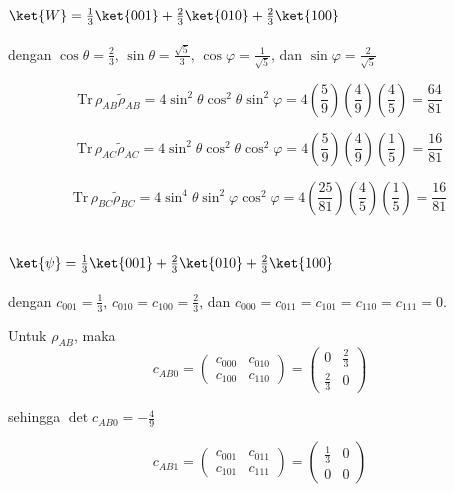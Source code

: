 \subsection{$\ket{W}=\frac{1}{3}\ket{001}+\frac{2}{3}\ket{010}+\frac{2}{3}\ket{100}$}
dengan $\cos\theta=\frac{2}{3}$, $\sin\theta={\frac{\sqrt{5}}{3}}$, $\cos\varphi=\frac{1}{\sqrt{5}}$, dan $\sin\varphi=\frac{2}{\sqrt{5}}$

\begin{equation}
	\mathrm{Tr}\,\rho_{AB}\tilde{\rho}_{AB}=4\sin^2\theta \cos^2\theta \sin^2\varphi=4(\frac{5}{9})(\frac{4}{9})(\frac{4}{5})=\frac{64}{81}
\end{equation}

\begin{equation}
	\mathrm{Tr}\,\rho_{AC}\tilde{\rho}_{AC}=4\sin^2\theta \cos^2\theta \cos^2\varphi=4(\frac{5}{9})(\frac{4}{9})(\frac{1}{5})=\frac{16}{81}
\end{equation}

\begin{equation}
	\mathrm{Tr}\,\rho_{BC}\tilde{\rho}_{BC}=4\sin^4\theta \sin^2\varphi\cos^2\varphi=4(\frac{25}{81})(\frac{4}{5})(\frac{1}{5})=\frac{16}{81}
\end{equation}

\subsection{ $\ket{\psi}=\frac{1}{3}\ket{001}+\frac{2}{3}\ket{010}+\frac{2}{3}\ket{100}$}
dengan $c_{001}=\frac{1}{3}$, $c_{010}=c_{100}=\frac{2}{3}$, dan $c_{000}=c_{011}=c_{101}=c_{110}=c_{111}=0$.

Untuk $\rho_{AB}$, maka
\begin{equation}
	c_{AB0}=
	\begin{pmatrix}
		c_{000} & c_{010} \\
		c_{100} & c_{110}
	\end{pmatrix}=
	\begin{pmatrix}
		0 & \frac{2}{3} \\
		\frac{2}{3} & 0
	\end{pmatrix}
\end{equation}

sehingga $\det c_{AB0} = -\frac{4}{9}$

\begin{equation}
	c_{AB1}=
	\begin{pmatrix}
		c_{001} & c_{011} \\
		c_{101} & c_{111}
	\end{pmatrix}=
	\begin{pmatrix}
		\frac{1}{3} & 0 \\
		0 & 0
	\end{pmatrix}
\end{equation}

